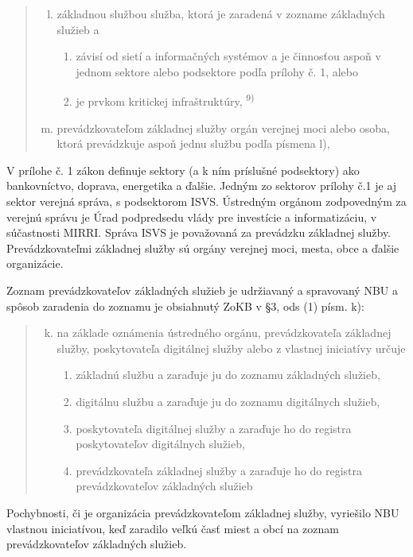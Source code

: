 \begin{quote}
\begin{enumerate}[a)] \setcounter{enumi}{11}
  \item základnou službou služba, ktorá je zaradená v zozname základných služieb a
  \begin{enumerate}[1.]
    \item závisí od sietí a informačných systémov a je činnosťou aspoň v jednom sektore alebo podsektore podľa prílohy č. 1, alebo
    \item je prvkom kritickej infraštruktúry, \textsuperscript{9)}
  \end{enumerate}

  \item prevádzkovateľom základnej služby orgán verejnej moci alebo osoba, ktorá prevádzkuje aspoň jednu službu podľa písmena l),
\end{enumerate}
\end{quote}
V prílohe č. 1 zákon definuje sektory (a k ním príslušné podsektory) ako bankovníctvo, doprava, energetika a ďalšie. Jedným
zo sektorov prílohy č.1 je aj sektor verejná správa, s podsektorom ISVS. Ústredným orgánom zodpovedným za verejnú správu
je Úrad podpredsedu vlády pre investície a informatizáciu, v súčastnosti MIRRI. Správa ISVS je považovaná za prevádzku 
základnej služby. Prevádzkovateľmi základnej služby sú orgány verejnej moci, mesta, obce a ďalšie organizácie. 

Zoznam prevádzkovateľov základných služieb je udržiavaný a spravovaný \acrshort{NBU} a spôsob zaradenia do zoznamu je obsiahnutý
\acrshort{ZoKB} v \S 3, ods (1) písm. k):
\begin{quote}
\begin{enumerate}[a)] \setcounter{enumi}{10}
  \item na základe oznámenia ústredného orgánu, prevádzkovateľa základnej služby, poskytovateľa digitálnej služby alebo z
  vlastnej iniciatívy určuje
  \begin{enumerate}[1.]
    \item základnú službu a zaraďuje ju do zoznamu základných služieb,
    \item digitálnu službu a zaraďuje ju do zoznamu digitálnych služieb,
    \item poskytovateľa digitálnej služby a zaraďuje ho do registra poskytovateľov digitálnych služieb,
    \item prevádzkovateľa základnej služby a zaraďuje ho do registra prevádzkovateľov základných služieb  
  \end{enumerate}
\end{enumerate}
\end{quote}
Pochybnosti, či je organizácia prevádzkovateľom základnej služby, vyriešilo \acrshort{NBU} vlastnou iniciatívou, keď zaradilo
veľkú časť miest a obcí na zoznam prevádzkovateľov základných služieb.

